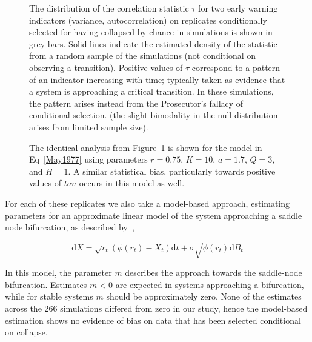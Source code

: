 \documentclass[authoryear,review,12pt]{elsarticle}
\newcommand{\ud}{\mathrm{d}}
\newif\ifhavefigures
\begin{document}
\begin{figure}
  \begin{center}
    \ifhavefigures
    \texttt{[image: figure2]}
    \fi
  \end{center}
  \caption{The distribution of the correlation statistic $\tau$ for two
  early warning indicators (variance, autocorrelation) on replicates
  conditionally selected for having collapsed by chance in simulations
  is shown in grey bars.  Solid lines indicate the estimated density of
  the statistic from a random sample of the simulations (not conditional
  on observing a transition). Positive values of $\tau$ correspond to
  a pattern of an indicator increasing with time; typically taken as
  evidence that a system is approaching a critical transition.  In these
  simulations, the pattern arises instead from the Prosecutor's fallacy
  of conditional selection. (the slight bimodality in the null distribution
  arises from limited sample size).}
  \label{fig:indicator}
\end{figure}

\begin{figure}
  \begin{center}
    \ifhavefigures
    \texttt{[image: figure3]}
    \fi
  \end{center}
  \caption{The identical analysis from Figure~\ref{fig:indicator} is shown for the model in Eq~\eqref{May1977} using parameters $r = 0.75$, $K=10$, $a=1.7$, $Q=3$, and $H=1$. A similar statistical bias, particularly towards positive values of $tau$ occurs in this model as well.}
  \label{fig:may}
\end{figure}



For each of these replicates we also take a model-based
approach, estimating parameters for an approximate linear
model of the system approaching a saddle node bifurcation, as
described by~\citet{Boettiger2012b},


\begin{equation}
\ud X = \sqrt{ r_t } (\phi(r_t) - X_t)\ud t + \sigma\sqrt{\phi(r_t) } \ud B_t \label{LSN}
\end{equation}


In this model, the parameter $m$
describes the approach towards the saddle-node bifurcation.  Estimates
$m < 0 $ are expected in systems approaching a bifurcation, while for
stable systems $m$ should be approximately zero. None of the estimates
across the 266 simulations differed from zero in our study, hence the
model-based estimation shows no evidence of bias on data that has been
selected conditional on collapse.
\end{document}
